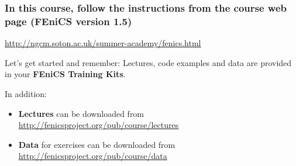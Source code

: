 \documentclass{fenicscourse}
\begin{document}














\begin{frame}[fragile]
\frametitle{In this course, follow the instructions from the course web page (FEniCS version 1.5)}

\alert{\url{http://ngcm.soton.ac.uk/summer-academy/fenics.html}}


\end{frame}


\begin{frame}{Let's get started and remember:}
  Lectures, code examples and data are provided in your {\bf FEniCS
    Training Kits}.

  \bigskip

  In addition:
  \begin{itemize}
    \itemsep1em
  \item
    {\textbf{Lectures} can be downloaded from
      \url{http://fenicsproject.org/pub/course/lectures}}

  \item
    {\textbf{Data} for exercises can be downloaded from
      \url{http://fenicsproject.org/pub/course/data}} \\

  \end{itemize}

\end{frame}
\end{document}

